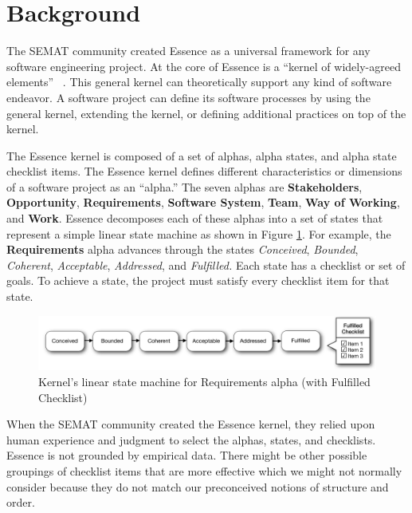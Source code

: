 \documentclass[preprint,12pt,3p]{elsarticle}
\begin{document}
\linenumbers

\section{Background}
The SEMAT community created Essence as a universal framework for any software engineering project. At the core of Essence is a ``kernel of widely-agreed elements'' ~\cite{JacobsonQueue}. This general kernel can theoretically support any kind of software endeavor. A software project can define its software processes by using the general kernel, extending the kernel, or defining additional practices on top of the kernel.

The Essence kernel is composed of a set of alphas, alpha states, and alpha state checklist items. The Essence kernel defines different characteristics or dimensions of a software project as an ``alpha.'' The seven alphas are \textbf{Stakeholders}, \textbf{Opportunity}, \textbf{Requirements}, \textbf{Software System}, \textbf{Team}, \textbf{Way of Working}, and \textbf{Work}. Essence decomposes each of these alphas into a set of states that represent a simple linear state machine as shown in Figure \ref{StateMachine}. For example, the \textbf{Requirements} alpha advances through the states \textit{Conceived}, \textit{Bounded}, \textit{Coherent}, \textit{Acceptable}, \textit{Addressed}, and \textit{Fulfilled.} Each state has a checklist or set of goals. To achieve a state, the project must satisfy every checklist item for that state. \cite{OMGStandard} 
 
\begin{figure}[h]\vspace*{4pt}
\centerline{\includegraphics[width=5.4in]{kernel_images/StateMachineRequirements}}
\caption{Kernel's linear state machine for Requirements alpha (with Fulfilled Checklist)}\vspace*{-6pt}\label{StateMachine}
\end{figure}

When the SEMAT community created the Essence kernel, they relied upon human experience and judgment to select the alphas, states, and checklists. Essence is not grounded by empirical data. There might be other possible groupings of checklist items that are more effective which we might not normally consider because they do not match our preconceived notions of structure and order.
\end{document}

